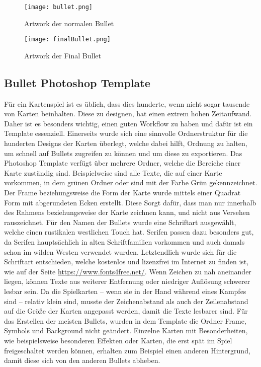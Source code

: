 \begin{figure}[H]
    \centering
    \texttt{[image: bullet.png]}
    \caption{Artwork der normalen Bullet}
\end{figure}

\begin{figure}[H]
    \centering
    \texttt{[image: finalBullet.png]}
    \caption{Artwork der Final Bullet}
\end{figure}

\subsection{Bullet Photoshop Template}

Für ein Kartenspiel ist es üblich, dass dies hunderte, wenn nicht sogar tausende von Karten beinhalten. Diese zu designen, hat einen extrem hohen Zeitaufwand. Daher ist es besonders wichtig, einen guten Workflow zu haben und dafür ist ein Template essenziell. Einerseits wurde sich eine sinnvolle Ordnerstruktur für die hunderten Designs der Karten überlegt, welche dabei hilft, Ordnung zu halten, um schnell auf Bullets zugreifen zu können und um diese zu exportieren. Das Photoshop Template verfügt über mehrere Ordner, welche die Bereiche einer Karte zuständig sind. Beispielweise sind alle Texte, die auf einer Karte vorkommen, in dem grünen Ordner  oder sind mit der Farbe Grün gekennzeichnet. Der Frame beziehungsweise die Form der Karte wurde mittels einer Quadrat Form mit abgerundeten Ecken erstellt. Diese Sorgt dafür, dass man nur innerhalb des Rahmens beziehungsweise der Karte zeichnen kann, und nicht aus Versehen rauszeichnet. Für den Namen der Bullets wurde eine Schriftart ausgewählt, welche einen rustikalen westlichen Touch hat. Serifen passen dazu besonders gut, da Serifen hauptsächlich in alten Schriftfamilien vorkommen und auch damals schon im wilden Westen verwendet wurden. Letztendlich wurde sich für die Schriftart
 entschieden, welche kostenlos und lizenzfrei im Internet zu finden ist, wie auf der Seite \url{https://www.fonts4free.net/}. Wenn Zeichen zu nah aneinander liegen, können Texte aus weiterer Entfernung oder niedriger Auflösung schwerer lesbar sein. Da die Spielkarten – wenn sie in der Hand während eines Kampfes sind – relativ klein sind, musste der Zeichenabstand als auch der Zeilenabstand auf die Größe der Karten angepasst werden, damit die Texte lesbarer sind. Für das Erstellen der meisten Bullets, wurden in dem Template die Ordner Frame, Symbols und Background nicht geändert. Einzelne Karten mit Besonderheiten, wie beispielsweise besonderen Effekten oder Karten, die erst spät im Spiel freigeschaltet werden können, erhalten zum Beispiel einen anderen Hintergrund, damit diese sich von den anderen Bullets abheben.

